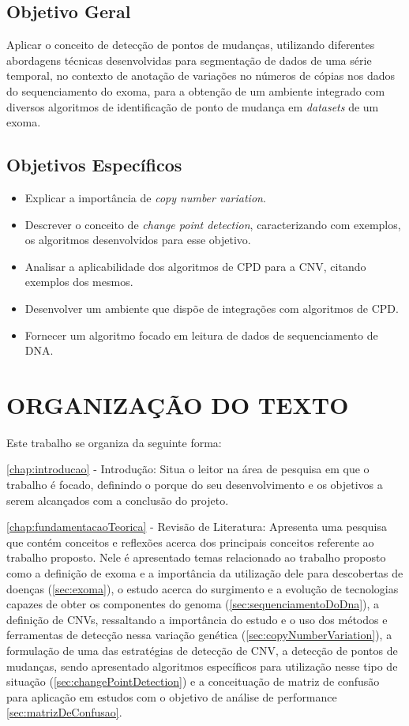 \subsection{Objetivo Geral}

Aplicar o conceito de detecção de pontos de mudanças, utilizando diferentes abordagens técnicas desenvolvidas para segmentação de dados de uma série temporal, no contexto de anotação de variações no números de cópias nos dados do sequenciamento do exoma, para a obtenção de um ambiente integrado com diversos algoritmos de identificação de ponto de mudança em \textit{datasets} de um exoma.

\subsection{Objetivos Específicos}
	
\begin{itemize}
    \item Explicar a importância de \textit{copy number variation}.
    \item Descrever o conceito de \textit{change point detection}, caracterizando com exemplos, os algoritmos desenvolvidos para esse objetivo.
    \item Analisar a aplicabilidade dos algoritmos de CPD para a CNV, citando exemplos dos mesmos.
    \item Desenvolver um ambiente que dispõe de integrações com algoritmos de CPD.
    \item Fornecer um algoritmo focado em leitura de dados de sequenciamento de DNA.
\end{itemize}

\section{ORGANIZAÇÃO DO TEXTO}

Este trabalho se organiza da seguinte forma: 

\autoref{chap:introducao} - Introdução: Situa o leitor na área de pesquisa em que o trabalho é focado, definindo o porque do seu desenvolvimento e os objetivos a serem alcançados com a conclusão do projeto.

\autoref{chap:fundamentacaoTeorica} - Revisão de Literatura: Apresenta uma pesquisa que contém conceitos e reflexões acerca dos principais conceitos referente ao trabalho proposto. Nele é apresentado temas relacionado ao trabalho proposto como a definição de exoma e a importância da utilização dele para descobertas de doenças (\autoref{sec:exoma}), o estudo acerca do surgimento e a evolução de tecnologias capazes de obter os componentes do genoma (\autoref{sec:sequenciamentoDoDna}), a definição de CNVs, ressaltando a importância do estudo e o uso dos métodos e ferramentas de detecção nessa variação genética (\autoref{sec:copyNumberVariation}), a formulação de uma das estratégias de detecção de CNV, a detecção de pontos de mudanças, sendo apresentado algoritmos específicos para utilização nesse tipo de situação (\autoref{sec:changePointDetection}) e a conceituação de matriz de confusão para aplicação em estudos com o objetivo de análise de performance \autoref{sec:matrizDeConfusao}. 

